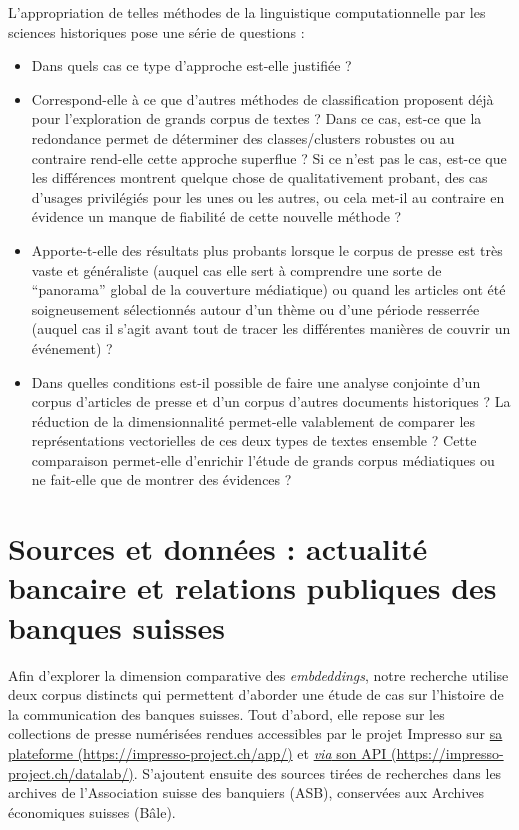 \documentclass[final, fra]{anthology-ch}     %
\begin{document}
L’appropriation de telles méthodes de la linguistique computationnelle par les sciences historiques pose une série de questions :
\begin{itemize}
    \item Dans quels cas ce type d’approche est-elle justifiée ?
    \item Correspond-elle à ce que d’autres méthodes de classification proposent déjà pour l’exploration de grands corpus de textes ? Dans ce cas, est-ce que la redondance permet de déterminer des classes/clusters robustes ou au contraire rend-elle cette approche superflue ? Si ce n’est pas le cas, est-ce que les différences montrent quelque chose de qualitativement probant, des cas d’usages privilégiés pour les unes ou les autres, ou cela met-il au contraire en évidence un manque de fiabilité de cette nouvelle méthode ?
    \item Apporte-t-elle des résultats plus probants lorsque le corpus de presse est très vaste et généraliste (auquel cas elle sert à comprendre une sorte de “panorama” global de la couverture médiatique) ou quand les articles ont été soigneusement sélectionnés autour d’un thème ou d’une période resserrée (auquel cas il s’agit avant tout de tracer les différentes manières de couvrir un événement) ?
    \item Dans quelles conditions est-il possible de faire une analyse conjointe d’un corpus d’articles de presse et d’un corpus d’autres documents historiques ? La réduction de la dimensionnalité permet-elle valablement de comparer les représentations vectorielles de ces deux types de textes ensemble ? Cette comparaison permet-elle d’enrichir l’étude de grands corpus médiatiques ou ne fait-elle que de montrer des évidences ?
\end{itemize}

\section{Sources et données : actualité bancaire et relations publiques des banques suisses}

Afin d'explorer la dimension comparative des \textit{embdeddings}, notre recherche utilise deux corpus distincts qui permettent d’aborder une étude de cas sur l’histoire de la communication des banques suisses. Tout d’abord, elle repose sur les collections de presse numérisées rendues accessibles par le projet Impresso sur \href{https://impresso-project.ch/app/}{sa plateforme (https://impresso-project.ch/app/)} et \href{https://impresso-project.ch/datalab/}{\textit{via} son API (https://impresso-project.ch/datalab/)}. S’ajoutent ensuite des sources tirées de recherches dans les archives de l'Association suisse des banquiers (ASB), conservées aux Archives économiques suisses (Bâle).
\end{document}

